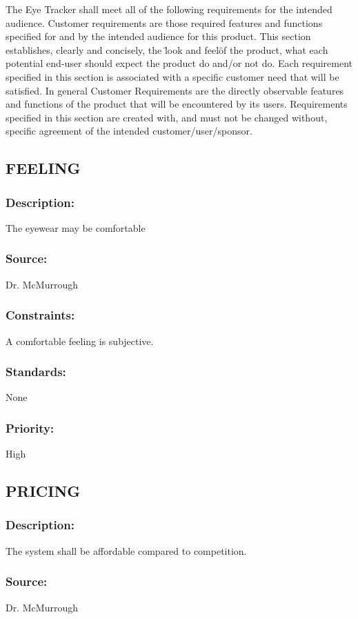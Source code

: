 The Eye Tracker shall meet all of the following requirements for the intended audience. Customer requirements are those required features and functions specified for and by the intended audience for this product. This section establishes, clearly and concisely, the \"look and feel\" of the product, what each potential end-user should expect the product do and/or not do. Each requirement specified in this section is associated with a specific customer need that will be satisfied. In general Customer Requirements are the directly observable features and functions of the product that will be encountered by its users. Requirements specified in this section are created with, and must not be changed without, specific agreement of the intended customer/user/sponsor.

\subsection{\text FEELING}
\subsubsection{Description:}
	{The eyewear may be comfortable}
\subsubsection{Source: }
	{Dr. McMurrough}
\subsubsection{Constraints:}
	{ A comfortable feeling is subjective.}
\subsubsection{Standards:}
	{ None}
\subsubsection{Priority:}
	{ High}

\subsection{\text PRICING}
\subsubsection{Description:} 
	{The system shall be affordable compared to competition.}
\subsubsection{Source:} 
	{Dr. McMurrough}

